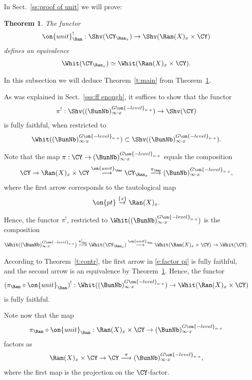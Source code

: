 \documentclass[9pt]{amsart}
\newtheorem{thm}[subsubsection]{Theorem}
\theoremstyle{definition}
\theoremstyle{remark}
\newcommand{\thmref}[1]{Theorem~\ref{#1}}
\newcommand{\secref}[1]{Sect.~\ref{#1}}
\numberwithin{equation}{section}
\begin{document}
In \secref{ss:proof of unit} we will prove:

\begin{thm} \label{t:unit}
The functor
$$\on{unit}_\Ran^!:\Shv(\CY_{\Ran_x} )\to \Shv(\Ran(X)_x\times \CY)$$
defines an equivalence 
$$\Whit(\CY_{\Ran_x} )\simeq \Whit(\Ran(X)_x\times \CY).$$
\end{thm}

  \label{ss:proof of main}

In this subsection we will deduce \thmref{t:main} from \thmref{t:unit}. 

\sssec{}

As was explained in \secref{sss:ff enough}, it suffices to show that the functor
$$\pi^!:\Shv((\BunNb)^{G\on{-level}_{n\cdot x}}_{\infty\cdot x})\to \Shv(\CY)$$
is fully faithful, when restricted to 
$$\Whit((\BunNb)^{G\on{-level}_{n\cdot x}}_{\infty\cdot x})\subset \Shv((\BunNb)^{G\on{-level}_{n\cdot x}}_{\infty\cdot x}).$$

\sssec{}

Note that the map $\pi:\CY\to (\BunNb)^{G\on{-level}_{n\cdot x}}_{\infty\cdot x}$ equals the composition
$$\CY\to \Ran(X)_x\times \CY \overset{\on{unit}_\Ran}\longrightarrow \CY_{\Ran_x} \overset{\pi_\Ran}\longrightarrow 
(\BunNb)^{G\on{-level}_{n\cdot x}}_{\infty\cdot x},$$
where the first arrow corresponds to the tautological map 
$$\on{pt}\overset{\{x\}}\to \Ran(X)_x.$$

\medskip

Hence, the functor $\pi^!$, restricted to $\Whit((\BunNb)^{G\on{-level}_{n\cdot x}}_{\infty\cdot x})$ is the composition
\begin{equation} \label{e:factor pi}
\Whit((\BunNb)^{G\on{-level}_{n\cdot x}}_{\infty\cdot x}) \overset{\pi_\Ran^!}\longrightarrow \Whit(\CY_{\Ran_x} ) 
\overset{\on{unit}_\Ran}\longrightarrow \Whit(\Ran(X)_x\times \CY)  \to \Whit(\CY).
\end{equation}

\medskip

According to \thmref{t:contr}, the first arrow in \eqref{e:factor pi} is fully faithful, and the second arrow is an equivalence by
\thmref{t:unit}. Hence, the functor
$$(\pi_\Ran \circ \on{unit}_\Ran)^!:
\Whit((\BunNb)^{G\on{-level}_{n\cdot x}}_{\infty\cdot x})\to \Whit(\Ran(X)_x\times \CY)$$
is fully faithful.

\sssec{}

Note now that the map
$$\pi_\Ran \circ \on{unit}_\Ran:\Ran(X)_x\times \CY\to (\BunNb)^{G\on{-level}_{n\cdot x}}_{\infty\cdot x}$$
factors as
$$\Ran(X)_x\times \CY\to \CY \overset{\pi}\longrightarrow (\BunNb)^{G\on{-level}_{n\cdot x}}_{\infty\cdot x},$$
where the first map is the projection on the $\CY$-factor.
\end{document}
